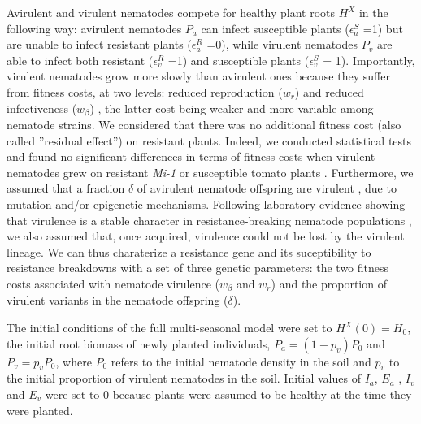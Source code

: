 {{{{Avirulent and virulent nematodes compete for healthy plant roots
$H^{X}$ in the following way: avirulent nematodes $P_{a}$ can infect
susceptible plants ($\epsilon_{a}^{S}$ =1) but are unable to infect
resistant plants ($\epsilon_{a}^{R}$ =0), while virulent nematodes
$P_{v}$ are able to infect both resistant ($\epsilon_{v}^{R}$ =1) and
susceptible plants ($\epsilon_{v}^{S}$ = 1).  Importantly, virulent
nematodes grow more slowly than avirulent ones because they suffer
from fitness costs, at two levels: reduced reproduction ($w_{r}$)
\citep{Jarquin-Barberena1991,Castagnone-Sereno2007,Meher2009,Djian-Caporalino2011}
and reduced infectiveness ($w_{\beta}$)
\citep{Castagnone-Sereno2007,Castagnone-Sereno2015}, the latter cost
being weaker and more variable among nematode strains.  We considered
that there was no additional fitness cost (also called ''residual
effect'') on resistant plants. Indeed, we conducted statistical tests
and found no significant differences in terms of fitness costs when
virulent nematodes grew on resistant \textit{Mi-1 }or susceptible
tomato plants \citep{Castagnone-Sereno2007}.  Furthermore, we assumed
that a fraction $\delta$ of avirulent nematode offspring are virulent
\citep{Castagnone-Sereno1994}, due to mutation and/or epigenetic
mechanisms. Following laboratory evidence showing that virulence is a
stable character in resistance-breaking nematode populations
\citep{Castagnone-Sereno1993}, we also assumed that, once acquired,
virulence could not be lost by the virulent lineage. We can thus
charaterize a resistance gene and its suceptibility to resistance
breakdowns with a set of three genetic parameters: the two fitness
costs associated with nematode virulence ($w_{\beta}$ and $w_{r}$) and
the proportion of virulent variants in the nematode offspring
($\delta$).

The initial conditions of the full multi-seasonal model were set to
$H^{X}(0)=H_{0}$, the initial root biomass of newly planted
individuals, $P_{a}=(1-p_{v})P_{0}$ and $P_{v}=p_{v}P_{0}$, where
$P_{0}$ refers to the initial nematode density in the soil and $p_{v}$
to the initial proportion of virulent nematodes in the soil. Initial
values of $I_{a}$, $E_{a}$ , $I_{v}$ and $E_{v}$ were set to 0 because
plants were assumed to be healthy at the time they were planted.

}}}}
